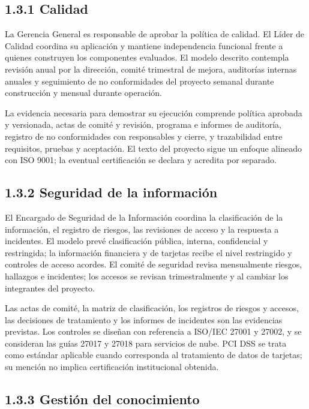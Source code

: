 \documentclass[11pt]{article}
\begin{document}
\hypertarget{calidad}{%
\subsection{1.3.1 Calidad}\label{calidad}}

La Gerencia General es responsable de aprobar la política de calidad. El Líder de Calidad coordina su aplicación y mantiene independencia funcional frente a quienes construyen los componentes evaluados. El modelo descrito contempla revisión anual por la dirección, comité trimestral de mejora, auditorías internas anuales y seguimiento de no conformidades del proyecto semanal durante construcción y mensual durante operación.

La evidencia necesaria para demostrar su ejecución comprende política aprobada y versionada, actas de comité y revisión, programa e informes de auditoría, registro de no conformidades con responsables y cierre, y trazabilidad entre requisitos, pruebas y aceptación. El texto del proyecto sigue un enfoque alineado con ISO 9001; la eventual certificación se declara y acredita por separado.

\hypertarget{seguridad-de-la-informaciuxf3n}{%
\subsection{1.3.2 Seguridad de la información}\label{seguridad-de-la-informaciuxf3n}}

El Encargado de Seguridad de la Información coordina la clasificación de la información, el registro de riesgos, las revisiones de acceso y la respuesta a incidentes. El modelo prevé clasificación pública, interna, confidencial y restringida; la información financiera y de tarjetas recibe el nivel restringido y controles de acceso acordes. El comité de seguridad revisa mensualmente riesgos, hallazgos e incidentes; los accesos se revisan trimestralmente y al cambiar los integrantes del proyecto.

Las actas de comité, la matriz de clasificación, los registros de riesgos y accesos, las decisiones de tratamiento y los informes de incidentes son las evidencias previstas. Los controles se diseñan con referencia a ISO/IEC 27001 y 27002, y se consideran las guías 27017 y 27018 para servicios de nube. PCI DSS se trata como estándar aplicable cuando corresponda al tratamiento de datos de tarjetas; su mención no implica certificación institucional obtenida.

\hypertarget{gestiuxf3n-del-conocimiento}{%
\subsection{1.3.3 Gestión del conocimiento}\label{gestiuxf3n-del-conocimiento}}
\end{document}

